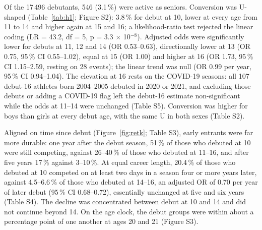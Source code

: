 \documentclass[12pt,a4paper]{article}
\begin{document}
Of the 17\,496 debutants, 546 (3.1\,\%) were active as seniors. Conversion was U-shaped (Table~\ref{tab:h1}; Figure S2): 3.8\,\% for debut at 10, lower at every age from 11 to 14 and higher again at 15 and 16; a likelihood-ratio test rejected the linear coding (LR = 43.2, df = 5, p = 3.3 $\times$ 10$^{-8}$). Adjusted odds were significantly lower for debuts at 11, 12 and 14 (OR 0.53--0.63), directionally lower at 13 (OR 0.75, 95\,\% CI 0.55--1.02), equal at 15 (OR 1.00) and higher at 16 (OR 1.73, 95\,\% CI 1.15--2.59, resting on 28 events); the linear trend was null (OR 0.99 per year, 95\,\% CI 0.94--1.04). The elevation at 16 rests on the COVID-19 seasons: all 107 debut-16 athletes born 2004--2005 debuted in 2020 or 2021, and excluding those debuts or adding a COVID-19 flag left the debut-16 estimate non-significant while the odds at 11--14 were unchanged (Table S5). Conversion was higher for boys than girls at every debut age, with the same U in both sexes (Table S2).

\begin{table}[H]
\centering
\caption{Senior activity (age $\geq$20) and competing at equal career length, by debut age (n = 17\,496; 546 senior events, 2\,312 equal-career-length events). \% = raw proportion; odds ratios relative to debut at age 10, adjusted for sex, birth cohort, and club size. Competing $\geq$4 years after debut: at least two competition days in a single season four or more years after the debut season. A likelihood-ratio test favours the categorical over the linear coding for the senior outcome (LR = 43.2, df = 5, p $<$ 0.001); the debut-16 senior estimate rests on 28 events and is not robust to excluding debuts in 2020--2021 (Supplementary Table S5). Abbreviations: CI, confidence interval; LR, likelihood ratio; OR, odds ratio.}
\label{tab:h1}
\small

\end{table}

Aligned on time since debut (Figure~\ref{fig:retk}; Table S3), early entrants were far more durable: one year after the debut season, 51\,\% of those who debuted at 10 were still competing, against 26--40\,\% of those who debuted at 11--16, and after five years 17\,\% against 3--10\,\%. At equal career length, 20.4\,\% of those who debuted at 10 competed on at least two days in a season four or more years later, against 4.5--6.6\,\% of those who debuted at 14--16, an adjusted OR of 0.70 per year of later debut (95\,\% CI 0.68--0.72), essentially unchanged at five and six years (Table S4). The decline was concentrated between debut at 10 and 14 and did not continue beyond 14. On the age clock, the debut groups were within about a percentage point of one another at ages 20 and 21 (Figure S3).
\end{document}

